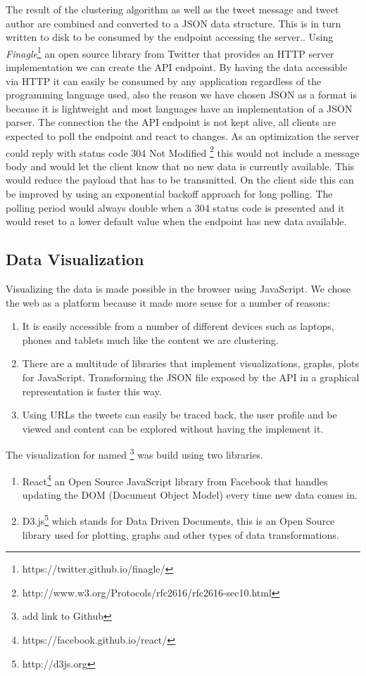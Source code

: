 The result of the clustering algorithm as well as the tweet message and tweet author are combined and converted to a JSON data structure. This is in turn written to disk to be consumed by the endpoint accessing the server.. Using \textit{Finagle}\footnote{https://twitter.github.io/finagle/} an open source library from Twitter that provides an HTTP server implementation we can create the API endpoint. By having the data accessible via HTTP it can easily be consumed by any application regardless of the programming language used, also the reason we have chosen JSON as a format is because it is lightweight and most languages have an implementation of a JSON parser. The connection the the API endpoint is not kept alive, all clients are expected to poll the endpoint and react to changes. As an optimization the server could reply with status code 304 Not Modified \footnote{http://www.w3.org/Protocols/rfc2616/rfc2616-sec10.html} this would not include a message body and would let the client know that no new data is currently available. This would reduce the payload that has to be transmitted. On the client side this can be improved by using an exponential backoff approach for long polling. The polling period would always double when a 304 status code is presented and it would reset to a lower default value when the endpoint has new data available.

\subsection{Data Visualization}
\label{datavisualization}

Visualizing the data is made possible in the browser using JavaScript. We chose the web as a platform because it made more sense for a number of reasons:
\begin{enumerate}
	\item It is easily accessible from a number of different devices such as laptops, phones and tablets much like the content we are clustering.
	\item There are a multitude of libraries that implement visualizations, graphs, plots for JavaScript. Transforming the JSON file exposed by the API in a graphical representation is faster this way.
	\item Using URLs the tweets can easily be traced back, the user profile and be viewed and content can be explored without having the implement it.
\end{enumerate}
The visualization for {\project} named \textbf{\frontend}\footnote{add link to Github} was build using two libraries.
\begin{enumerate}
	\item React\footnote{https://facebook.github.io/react/} an Open Source JavaScript library from Facebook that handles updating the DOM (Document Object Model) every time new data comes in.
	\item D3.js\footnote{http://d3js.org} which stands for Data Driven Documents, this is an Open Source library used for plotting, graphs and other types of data transformations.
\end{enumerate}

